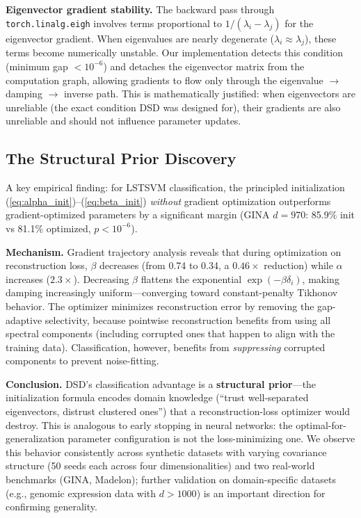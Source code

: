 \documentclass[journal]{IEEEtran}
\begin{document}
\textbf{Eigenvector gradient stability.} The backward pass through \texttt{torch.linalg.eigh} involves terms proportional to $1/(\lambda_i - \lambda_j)$ for the eigenvector gradient. When eigenvalues are nearly degenerate ($\lambda_i \approx \lambda_j$), these terms become numerically unstable. Our implementation detects this condition (minimum gap $< 10^{-6}$) and detaches the eigenvector matrix from the computation graph, allowing gradients to flow only through the eigenvalue $\to$ damping $\to$ inverse path. This is mathematically justified: when eigenvectors are unreliable (the exact condition DSD was designed for), their gradients are also unreliable and should not influence parameter updates.

\subsection{The Structural Prior Discovery}
\label{sec:structural_prior}

A key empirical finding: for LSTSVM classification, the principled initialization (\ref{eq:alpha_init})--(\ref{eq:beta_init}) \emph{without} gradient optimization outperforms gradient-optimized parameters by a significant margin (GINA $d{=}970$: 85.9\% init vs 81.1\% optimized, $p < 10^{-6}$).

\textbf{Mechanism.} Gradient trajectory analysis reveals that during optimization on reconstruction loss, $\beta$ decreases (from 0.74 to 0.34, a $0.46\times$ reduction) while $\alpha$ increases ($2.3\times$). Decreasing $\beta$ flattens the exponential $\exp(-\beta\delta_i)$, making damping increasingly uniform---converging toward constant-penalty Tikhonov behavior. The optimizer minimizes reconstruction error by removing the gap-adaptive selectivity, because pointwise reconstruction benefits from using all spectral components (including corrupted ones that happen to align with the training data). Classification, however, benefits from \emph{suppressing} corrupted components to prevent noise-fitting.

\textbf{Conclusion.} DSD's classification advantage is a \textbf{structural prior}---the initialization formula encodes domain knowledge (``trust well-separated eigenvectors, distrust clustered ones'') that a reconstruction-loss optimizer would destroy. This is analogous to early stopping in neural networks: the optimal-for-generalization parameter configuration is not the loss-minimizing one. We observe this behavior consistently across synthetic datasets with varying covariance structure (50 seeds each across four dimensionalities) and two real-world benchmarks (GINA, Madelon); further validation on domain-specific datasets (e.g., genomic expression data with $d > 1000$) is an important direction for confirming generality.
\end{document}
